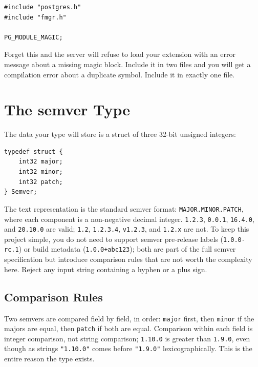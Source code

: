\documentclass[11pt,a4paper]{article}
\begin{document}
\begin{codebox}
\begin{lstlisting}
#include "postgres.h"
#include "fmgr.h"

PG_MODULE_MAGIC;
\end{lstlisting}
\end{codebox}

Forget this and the server will refuse to load your extension with an error message about a missing magic block. Include it in two files and you will get a compilation error about a duplicate symbol. Include it in exactly one file.

\section{The semver Type}

The data your type will store is a struct of three 32-bit unsigned integers:

\begin{codebox}
\begin{lstlisting}
typedef struct {
    int32 major;
    int32 minor;
    int32 patch;
} Semver;
\end{lstlisting}
\end{codebox}

The text representation is the standard semver format: \texttt{MAJOR.MINOR.PATCH}, where each component is a non-negative decimal integer. \texttt{1.2.3}, \texttt{0.0.1}, \texttt{16.4.0}, and \texttt{20.10.0} are valid; \texttt{1.2}, \texttt{1.2.3.4}, \texttt{v1.2.3}, and \texttt{1.2.x} are not. To keep this project simple, you do not need to support semver pre-release labels (\texttt{1.0.0-rc.1}) or build metadata (\texttt{1.0.0+abc123}); both are part of the full semver specification but introduce comparison rules that are not worth the complexity here. Reject any input string containing a hyphen or a plus sign.

\subsection{Comparison Rules}
Two semvers are compared field by field, in order: \texttt{major} first, then \texttt{minor} if the majors are equal, then \texttt{patch} if both are equal. Comparison within each field is integer comparison, not string comparison; \texttt{1.10.0} is greater than \texttt{1.9.0}, even though as strings \texttt{"1.10.0"} comes before \texttt{"1.9.0"} lexicographically. This is the entire reason the type exists.
\end{document}
